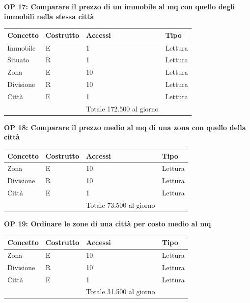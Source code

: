 \documentclass[a4paper,12pt]{report}
\begin{document}
            \textbf{OP 17: Comparare il prezzo di un immobile al mq con quello degli immobili nella stessa città}
        	\begin{table}[h!]
            \centering
             \begin{tabular}{||l l l l||}
             \hline
             Concetto & Costrutto & Accessi & Tipo \\ [0.5ex] 
             \hline\hline
             Immobile & E & 1 & Lettura \\ 
             Situato & R & 1 & Lettura \\ 
             Zona & E & 10 & Lettura \\ 
             Divisione & R & 10 & Lettura \\ 
             Città & E & 1 & Lettura \\ 
             \hline
                &   & Totale  172.500 al giorno &  \\ [1ex] 
             \hline
             \end{tabular}
            \end{table}

            \textbf{OP 18: Comparare il prezzo medio al mq di una zona con quello della città}
        	\begin{table}[h!]
            \centering
             \begin{tabular}{||l l l l||}
             \hline
             Concetto & Costrutto & Accessi & Tipo \\ [0.5ex] 
             \hline\hline
             Zona & E & 10 & Lettura \\ 
             Divisione & R & 10 & Lettura \\ 
             Città & E & 1 & Lettura \\ 
             \hline
                &   & Totale  73.500 al giorno &  \\ [1ex] 
             \hline
             \end{tabular}
            \end{table}

            \textbf{OP 19: Ordinare le zone di una città per costo medio al mq}
        	\begin{table}[h!]
            \centering
             \begin{tabular}{||l l l l||}
             \hline
             Concetto & Costrutto & Accessi & Tipo \\ [0.5ex] 
             \hline\hline
             Zona & E & 10 & Lettura \\ 
             Divisione & R & 10 & Lettura \\ 
             Città & E & 1 & Lettura \\ 
             \hline
                &   & Totale  31.500 al giorno &  \\ [1ex] 
             \hline
             \end{tabular}
            \end{table}
\end{document}
